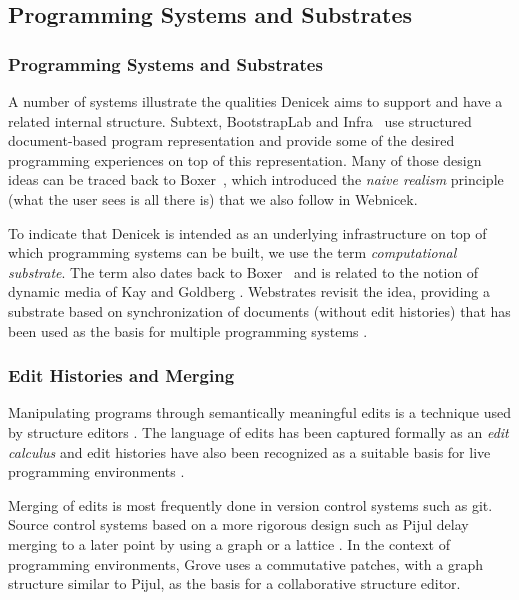 \documentclass[sigconf,anonymous,screen]{acmart}
\begin{document}

\subsection{Programming Systems and Substrates}
\label{sec:background-sys}

\subsubsection*{Programming Systems and Substrates}
A number of systems illustrate the qualities Denicek aims to support and have a related internal
structure. Subtext, BootstrapLab and Infra~\cite{edwards-2005-subtext,jakubovic-2022-ladder,hall-2017-infra}
use structured document-based program representation and provide some of the desired programming
experiences on top of this representation. Many of those design ideas can be traced back to
Boxer~\cite{disessa-1986-boxer}, which introduced the \emph{naive realism} principle (what the user
sees is all there is) that we also follow in Webnicek.

To indicate that Denicek is intended as an underlying infrastructure on top of which programming
systems can be built, we use the term \emph{computational substrate}. The term also dates back to
Boxer~\cite{disessa-1995-epistemology} and is related to the notion of dynamic media of Kay and
Goldberg \cite{kay-1977-media}. Webstrates \cite{klokmose-2015-webstrates}
revisit the idea, providing a substrate based on synchronization of documents (without edit
histories) that has been used as the basis for multiple programming systems \cite{radle-2017-codestrates,borowski-2022-varv}.

\subsubsection*{Edit Histories and Merging}
Manipulating programs through semantically meaningful edits is a technique used by structure
editors \cite{teitelbaum-1981-cps,hempel-2018-deuce,beckman-2023-sandblocks}. The language of
edits has been captured formally as an \emph{edit calculus} \cite{omar-2017-hazelnut} and
edit histories have also been recognized as a suitable basis for live programming environments \cite{storm-2013-deltas}.

Merging of edits is most frequently done in version control systems such as git. Source control systems
based on a more rigorous design such as Pijul \cite{meunier-2024-pijul} delay merging to a later point
by using a graph or a lattice \cite{schurmann-2022-merging}. In the context of
programming environments, Grove \cite{adams-2025-grove} uses a commutative patches, with a graph
structure similar to Pijul, as the basis for a collaborative structure editor.
\end{document}
